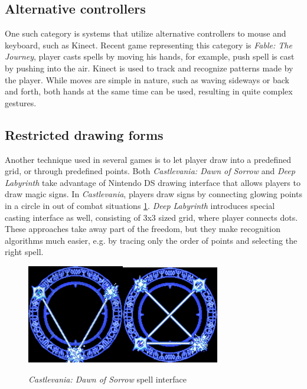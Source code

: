 \subsection{Alternative controllers}
One such category is systems that utilize alternative controllers to mouse and keyboard, such as Kinect. Recent game representing this category is \emph{Fable: The Journey}, player casts spells by moving his hands, for example, push spell is cast by pushing into the air. Kinect is used to track and recognize patterns made by the player. While moves are simple in nature, such as waving sideways or back and forth, both hands at the same time can be used, resulting in quite complex gestures.

\subsection{Restricted drawing forms}
Another technique used in several games is to let player draw into a predefined grid, or through predefined points. Both \emph{Castlevania: Dawn of Sorrow} and \emph{Deep Labyrinth} take advantage of Nintendo DS drawing interface that allows players to draw magic signs. In \emph{Castlevania}, players draw signs by connecting glowing points in a circle in out of combat situations \ref{fig:castlevania}. \emph{Deep Labyrinth} introduces special casting interface as well, consisting of 3x3 sized grid, where player connects dots. These approaches take away part of the freedom, but they make recognition algorithms much easier, e.g. by tracing only the order of points and selecting the right spell.

\begin{figure}[!htb]
\begin{center}
\label{fig:castlevania}
\includegraphics[width=.3\linewidth]{ext/castlevania.png}\quad\includegraphics[width=.3\linewidth]{ext/castlevania2.png}
\end{center}
    \centering
    \caption{\emph{Castlevania: Dawn of Sorrow} spell interface}
\end{figure}

